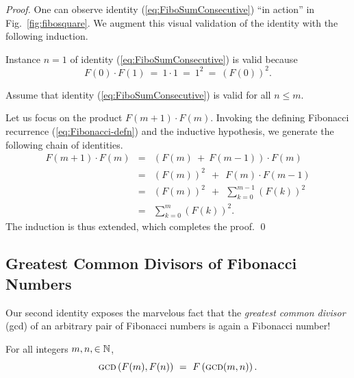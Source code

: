 \begin{proof}
One can observe identity (\ref{eq:FiboSumConsecutive}) ``in action''
in Fig.~\ref{fig:fibosquare}.  We augment this visual validation of
the identity with the following induction.

\medskip

Instance $n=1$ of identity (\ref{eq:FiboSumConsecutive}) is valid
because
\[ F(0) \cdot F(1) \ = \ 1 \cdot 1 \ = \ 1^2 \ = \ (F(0))^2. \]

\medskip

Assume that identity (\ref{eq:FiboSumConsecutive}) is valid for all $n
\leq m$.

\medskip

Let us focus on the product $F(m+1) \cdot F(m)$.  Invoking the defining Fibonacci recurrence
(\ref{eq:Fibonacci-defn}) and the inductive hypothesis, we generate the following chain of identities.
\begin{eqnarray*}
F(m+1) \cdot F(m)
 & = &
   (F(m) \ + \ F(m-1)) \cdot F(m) \\
 & = &
   (F(m))^2 \ \ + \ \ F(m) \cdot F(m-1)  \\
 & = & 
   (F(m))^2  \ \ + \ \ \sum_{k=0}^{m-1} (F(k))^2  \\
 & = &
   \sum_{k=0}^{m} (F(k))^2.
\end{eqnarray*}
The induction is thus extended, which completes the proof.
\qed
\end{proof}



\subsection{Greatest Common Divisors of Fibonacci Numbers}
\label{Appendix:FiboGCD}

Our second identity exposes the marvelous fact that the {\em greatest common divisor} ({\sc gcd}) of an arbitrary pair of Fibonacci numbers is again a Fibonacci number!

\begin{prop}
For all integers $m, n, \in \mathbb{N}$,
\begin{equation}
\label{eq:fibo-gcd}
\mbox{\sc gcd} \left(F(m), F(n) \right) \ = \ F \left(\mbox{\sc gcd}(m, n) \right).
\end{equation}
\end{prop}

\medskip

